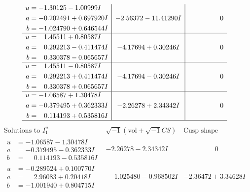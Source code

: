 \documentclass[1p]{elsarticle_modified}
\theoremstyle{definition}
\newcommand{\I}{\sqrt{-1}}
\begin{document}
$$\begin{array}{c|c|c}
\begin{aligned}
u &= -1.30125 - 1.00999 I \\
a &= -0.202491 + 0.697920 I \\
b &= -1.024790 + 0.646544 I\end{aligned}
 & -2.56372 - 11.41290 I & \phantom{-0.000000 } 0 \\ \hline\begin{aligned}
u &= \phantom{-}1.45511 + 0.80587 I \\
a &= \phantom{-}0.292213 - 0.411474 I \\
b &= \phantom{-}0.330378 - 0.065657 I\end{aligned}
 & -4.17694 + 0.30246 I & \phantom{-0.000000 } 0 \\ \hline\begin{aligned}
u &= \phantom{-}1.45511 - 0.80587 I \\
a &= \phantom{-}0.292213 + 0.411474 I \\
b &= \phantom{-}0.330378 + 0.065657 I\end{aligned}
 & -4.17694 - 0.30246 I & \phantom{-0.000000 } 0 \\ \hline\begin{aligned}
u &= -1.06587 + 1.30478 I \\
a &= -0.379495 + 0.362333 I \\
b &= \phantom{-}0.114193 + 0.535816 I\end{aligned}
 & -2.26278 + 2.34342 I & \phantom{-0.000000 } 0\\
 \hline 
 \end{array}$$\newpage$$\begin{array}{c|c|c}  
\text{Solutions to }I^u_{1}& \I (\text{vol} + \sqrt{-1}CS) & \text{Cusp shape}\\
 \hline 
\begin{aligned}
u &= -1.06587 - 1.30478 I \\
a &= -0.379495 - 0.362333 I \\
b &= \phantom{-}0.114193 - 0.535816 I\end{aligned}
 & -2.26278 - 2.34342 I & \phantom{-0.000000 } 0 \\ \hline\begin{aligned}
u &= -0.289524 + 0.100770 I \\
a &= \phantom{-}2.96083 + 0.20418 I \\
b &= -1.001940 + 0.804715 I\end{aligned}
 & \phantom{-}1.025480 - 0.968502 I & -2.36472 + 3.34628 I \\ \hline\begin{aligned}

\end{aligned}
\end{array}$$
\end{document}
